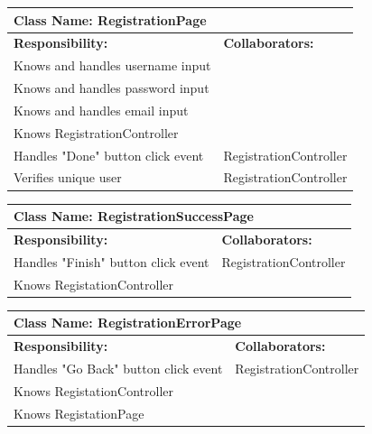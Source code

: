 \documentclass[]{article}
\begin{document}
	
	\begin{table}[H]
	\centering
	\begin{tabular}{|p{6cm}|p{6cm}|}
	\hline 
		\multicolumn{2}{|l|}{\textbf{Class Name: RegistrationPage}} \\
	\hline
	\textbf{Responsibility:} & \textbf{Collaborators:} \\
	\hline 
	Knows and handles username input &\\ \hline 
	Knows and handles password input &\\ \hline
	Knows and handles email input &\\ \hline
	Knows RegistrationController &\\ \hline
	Handles "Done" button click event  & RegistrationController\\ \hline
    Verifies unique user & RegistrationController\\ \hline
	\end{tabular}
	\end{table}
	
	\begin{table}[H]
	\centering
	\begin{tabular}{|p{6cm}|p{6cm}|}
	\hline 
		\multicolumn{2}{|l|}{\textbf{Class Name: RegistrationSuccessPage}} \\
	\hline
	\textbf{Responsibility:} & \textbf{Collaborators:} \\
	\hline 
	Handles "Finish" button click event  & RegistrationController\\ \hline 
	Knows RegistationController &\\ \hline
	\end{tabular}
	\end{table}
	
	\begin{table}[H]
	\centering
	\begin{tabular}{|p{6cm}|p{6cm}|}
	\hline 
		\multicolumn{2}{|l|}{\textbf{Class Name: RegistrationErrorPage}} \\
	\hline
	\textbf{Responsibility:} & \textbf{Collaborators:} \\
	\hline 
	Handles "Go Back" button click event  & RegistrationController\\ \hline 
	Knows RegistationController &\\ \hline
	Knows RegistationPage &\\ \hline
	\end{tabular}
	\end{table}
		
\end{document}
